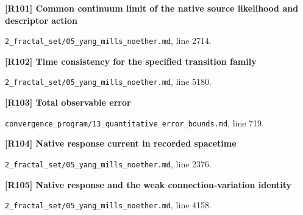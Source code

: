 \documentclass[11pt,a4paper]{article}
\begin{document}
\par\medskip\noindent\begin{minipage}{\linewidth}\textbf{[R101] Common continuum limit of the native source likelihood and descriptor action}\label{src:thm-ym-continuum-source-action}\par
{\small\texttt{}\par
\nolinkurl{2_fractal_set/05_yang_mills_noether.md}, line 2714.\par}
\end{minipage}\par

\par\medskip\noindent\begin{minipage}{\linewidth}\textbf{[R102] Time consistency for the specified transition family}\label{src:thm-correct-continuum-limit}\par
{\small\texttt{}\par
\nolinkurl{2_fractal_set/05_yang_mills_noether.md}, line 5180.\par}
\end{minipage}\par

\par\medskip\noindent\begin{minipage}{\linewidth}\textbf{[R103] Total observable error}\label{src:thm-total-error-bound}\par
{\small\texttt{}\par
\nolinkurl{convergence_program/13_quantitative_error_bounds.md}, line 719.\par}
\end{minipage}\par

\par\medskip\noindent\begin{minipage}{\linewidth}\textbf{[R104] Native response current in recorded spacetime}\label{src:thm-ym-native-response-current}\par
{\small\texttt{}\par
\nolinkurl{2_fractal_set/05_yang_mills_noether.md}, line 2376.\par}
\end{minipage}\par

\par\medskip\noindent\begin{minipage}{\linewidth}\textbf{[R105] Native response and the weak connection-variation identity}\label{src:prop-ym-native-connection-variation-identity}\par
{\small\texttt{}\par
\nolinkurl{2_fractal_set/05_yang_mills_noether.md}, line 4158.\par}
\end{minipage}\par
\end{document}
